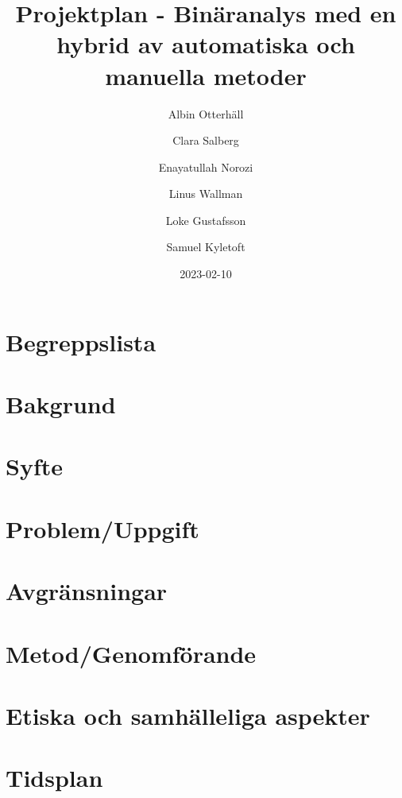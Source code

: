 \documentclass[12pt, a4paper]{article}
\title{Projektplan - Binäranalys med en hybrid av automatiska och manuella metoder}
\author{
    Albin Otterhäll \and
    Clara Salberg \and
    Enayatullah Norozi \and
    Linus Wallman \and
    Loke Gustafsson \and
    Samuel Kyletoft
}
\date{2023-02-10}
\begin{document}
%
\newcommand{\stoe}{S$^2$E}

\maketitle

\newpage

\newpage

\tableofcontents
\newpage

\section*{Begreppslista}


\newpage

\section{Bakgrund}


\section{Syfte}


\section{Problem/Uppgift}


\section{Avgränsningar}


\section{Metod/Genomförande}


\section{Etiska och samhälleliga aspekter}


\section{Tidsplan}


\end{document}
